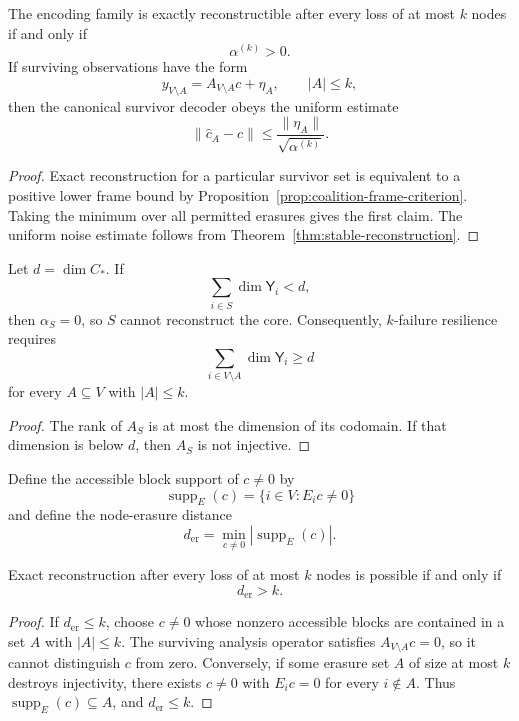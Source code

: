 \begin{theorem}\label{thm:uniform-erasure-resilience}
The encoding family is exactly reconstructible after every loss of at most
\(k\) nodes if and only if
\[
\boxed{\alpha^{(k)}>0.}
\]
If surviving observations have the form
\[
y_{V\setminus A}=A_{V\setminus A}c+\eta_A,
\qquad
|A|\leq k,
\]
then the canonical survivor decoder obeys the uniform estimate
\[
\boxed{
\|\widehat c_A-c\|
\leq
\frac{\|\eta_A\|}{\sqrt{\alpha^{(k)}}}.
}
\]
\end{theorem}

\begin{proof}
Exact reconstruction for a particular survivor set is equivalent to a
positive lower frame bound by Proposition~\ref{prop:coalition-frame-criterion}.
Taking the minimum over all permitted erasures gives the first claim. The
uniform noise estimate follows from Theorem~\ref{thm:stable-reconstruction}.
\end{proof}

\begin{proposition}\label{prop:dimension-obstruction}
Let \(d=\dim C_*\). If
\[
\sum_{i\in S}\dim \mathsf Y_i<d,
\]
then \(\alpha_S=0\), so \(S\) cannot reconstruct the core. Consequently,
\(k\)-failure resilience requires
\[
\sum_{i\in V\setminus A}\dim \mathsf Y_i\geq d
\]
for every \(A\subseteq V\) with \(|A|\leq k\).
\end{proposition}

\begin{proof}
The rank of \(A_S\) is at most the dimension of its codomain. If that
dimension is below \(d\), then \(A_S\) is not injective.
\end{proof}

Define the accessible block support of \(c\neq0\) by
\[
\operatorname{supp}_E(c)
=
\{i\in V:E_ic\neq0\}
\]
and define the node-erasure distance
\[
\boxed{
d_{\mathrm{er}}
=
\min_{c\neq0}|\operatorname{supp}_E(c)|.
}
\]

\begin{theorem}
\label{thm:erasure-distance}
Exact reconstruction after every loss of at most \(k\) nodes is possible if
and only if
\[
\boxed{
d_{\mathrm{er}}>k.
}
\]
\end{theorem}

\begin{proof}
If \(d_{\mathrm{er}}\leq k\), choose \(c\neq0\) whose nonzero accessible
blocks are contained in a set \(A\) with \(|A|\leq k\). The surviving analysis
operator satisfies \(A_{V\setminus A}c=0\), so it cannot distinguish \(c\)
from zero. Conversely, if some erasure set \(A\) of size at most \(k\) destroys
injectivity, there exists \(c\neq0\) with \(E_ic=0\) for every \(i\notin A\).
Thus \(\operatorname{supp}_E(c)\subseteq A\), and
\(d_{\mathrm{er}}\leq k\).
\end{proof}

